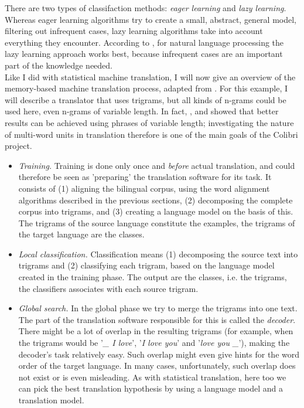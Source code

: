 \documentclass[12pt]{article}
\begin{document}
There are two types of classifaction methods: \emph{eager learning} and \emph{lazy learning}. Whereas eager learning algorithms try to create a small, abstract, general model, filtering out infrequent cases, lazy learning algorithms take into account everything they encounter. According to \citet{dvdb05}, for natural language processing the lazy learning approach works best, because infrequent cases are an important part of the knowledge needed. \\\indent
Like I did with statistical machine translation, I will now give an overview of the memory-based machine translation process, adapted from \citet{vdbb09}. For this example, I will describe a translator that uses trigrams, but all kinds of n-grams could be used here, even n-grams of variable length. In fact, \citet{vangompel09}, \citet{vangompelea09} and \citet{vangompel11} showed that better results can be achieved using phrases of variable length; investigating the nature of multi-word units in translation therefore is one of the main goals of the Colibri project.

\begin{itemize}
\item \emph{Training.} Training is done only once and \emph{before} actual translation, and could therefore be seen as 'preparing' the translation software for its task. It consists of (1) aligning the bilingual corpus, using the word alignment algorithms described in the previous sections, (2) decomposing the complete corpus into trigrams, and (3) creating a language model on the basis of this. The trigrams of the source language constitute the examples, the trigrams of the target language are the classes.

\item \emph{Local classification.} Classification means (1) decomposing the source text into trigrams and (2) classifying each trigram, based on the language model created in the training phase. The output are the classes, i.e. the trigrams, the classifiers associates with each source trigram.

\item \emph{Global search.} In the global phase we try to merge the trigrams into one text. The part of the translation software responsible for this is called the \emph{decoder}. There might be a lot of overlap in the resulting trigrams (for example, when the trigrams would be '\emph{\_ I love}', '\emph{I love you}' and '\emph{love you \_}'), making the decoder's task relatively easy. Such overlap might even give hints for the word order of the target language. In many cases, unfortunately, such overlap does not exist or is even misleading. As with statistical translation, here too we can pick the best translation hypothesis by using a language model and a translation model. 

\end{itemize}
\end{document}
